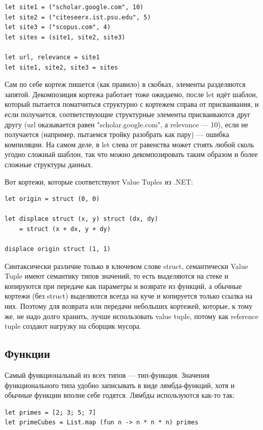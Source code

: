 \documentclass{../../text-style}
\begin{document}
\begin{verbatim}
let site1 = ("scholar.google.com", 10)
let site2 = ("citeseerx.ist.psu.edu", 5)
let site3 = ("scopus.com", 4)
let sites = (site1, site2, site3)

let url, relevance = site1
let site1, site2, site3 = sites
\end{verbatim}

Сам по себе кортеж пишется (как правило) в скобках, элементы разделяются запятой. Декомпозиция кортежа работает тоже ожидаемо, после let идёт шаблон, который пытается поматчиться структурно с кортежем справа от присваивания, и если получается, соответствующие структурные элементы присваиваются друг другу (url оказывается равен "scholar.google.com", а relevance --- 10), если не получается (например, пытаемся тройку разобрать как пару) --- ошибка компиляции. На самом деле, в let слева от равенства может стоять любой сколь угодно сложный шаблон, так что можно декомпозировать таким образом и более сложные структуры данных.

Вот кортежи, которые соответствуют Value Tuples из .NET:

\begin{verbatim}
let origin = struct (0, 0)

let displace struct (x, y) struct (dx, dy)
    = struct (x + dx, y + dy)

displace origin struct (1, 1)
\end{verbatim}

Синтаксически различие только в ключевом слове struct, семантически Value Tuple имеют семантику типов значений, то есть выделяются на стеке и копируются при передаче как параметры и возврате из функций, а обычные кортежи (без struct) выделяются всегда на куче и копируется только ссылка на них. Поэтому для возврата или передачи небольших кортежей, которые, к тому же, не надо долго хранить, лучше использовать value tuple, потому как reference tuple создают нагрузку на сборщик мусора.

\subsection{Функции}

Самый функциональный из всех типов --- тип-функция. Значения функционального типа удобно записывать в виде лямбда-функций, хотя и обычные функции вполне себе годятся. Лямбды используются как-то так:

\begin{verbatim}
let primes = [2; 3; 5; 7]
let primeCubes = List.map (fun n -> n * n * n) primes
\end{verbatim}
\end{document}
